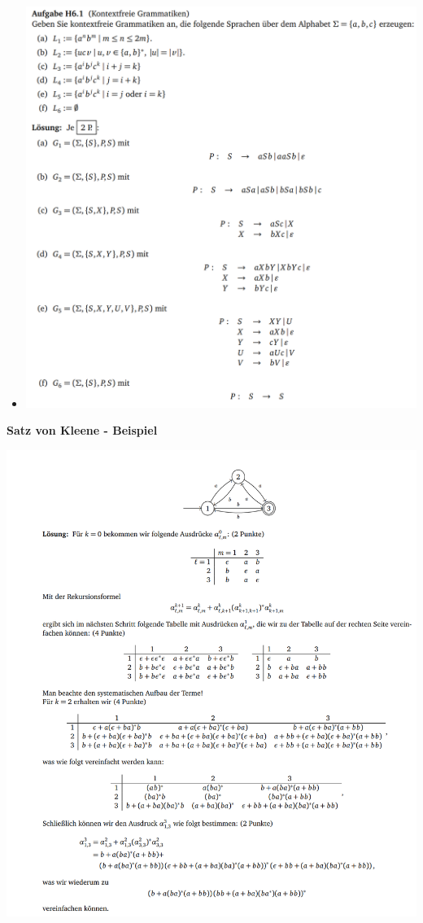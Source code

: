 \documentclass[11pt,a4paper]{article}
\begin{document}
{\begin{itemize}
\item[]
\begin{center}
\includegraphics[scale=1]{Bilder/gram3}
\end{center}

\end{itemize}

\pagebreak

{\Large \textbf{Satz von Kleene - Beispiel}}

\begin{center}
\includegraphics[scale=1]{Bilder/kleenebsp}
\end{center}

}
\end{document}
